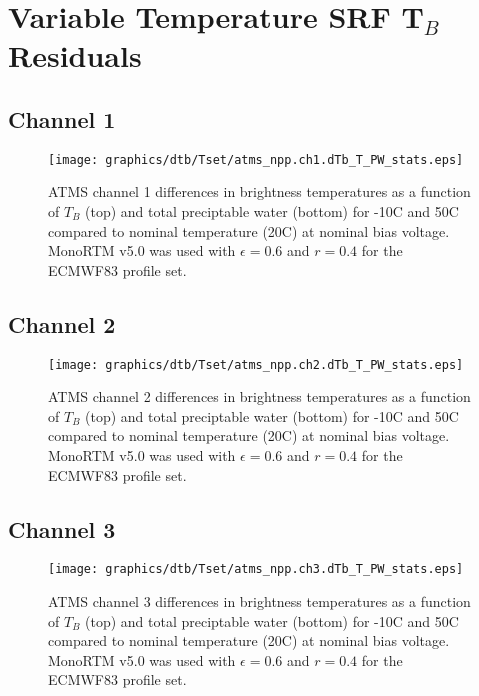 \section{Variable Temperature SRF T$_B$ Residuals}
\label{app:Tset_dtb_data_plots}

\subsection{Channel 1}
\begin{figure}[H]
  \label{fig:Tset.ch1_dtb}
  \centering
  \hspace{1.5cm}\texttt{[image: graphics/dtb/Tset/atms\_npp.ch1.dTb\_T\_PW\_stats.eps]}
  \caption{ATMS channel 1 differences in brightness temperatures as a function of $T_B$ (top) and total preciptable water (bottom) for -10\textdegree{}C and 50\textdegree{}C compared to nominal temperature (20\textdegree{}C) at nominal bias voltage. MonoRTM v5.0 was used with $\epsilon=0.6$ and $r=0.4$ for the ECMWF83 profile set.}
\end{figure}

\subsection{Channel 2}
\begin{figure}[H]
  \label{fig:Tset.ch2_dtb}
  \centering
  \hspace{1.5cm}\texttt{[image: graphics/dtb/Tset/atms\_npp.ch2.dTb\_T\_PW\_stats.eps]}
  \caption{ATMS channel 2 differences in brightness temperatures as a function of $T_B$ (top) and total preciptable water (bottom) for -10\textdegree{}C and 50\textdegree{}C compared to nominal temperature (20\textdegree{}C) at nominal bias voltage. MonoRTM v5.0 was used with $\epsilon=0.6$ and $r=0.4$ for the ECMWF83 profile set.}
\end{figure}

\subsection{Channel 3}
\begin{figure}[H]
  \label{fig:Tset.ch3_dtb}
  \centering
  \hspace{1.5cm}\texttt{[image: graphics/dtb/Tset/atms\_npp.ch3.dTb\_T\_PW\_stats.eps]}
  \caption{ATMS channel 3 differences in brightness temperatures as a function of $T_B$ (top) and total preciptable water (bottom) for -10\textdegree{}C and 50\textdegree{}C compared to nominal temperature (20\textdegree{}C) at nominal bias voltage. MonoRTM v5.0 was used with $\epsilon=0.6$ and $r=0.4$ for the ECMWF83 profile set.}
\end{figure}

